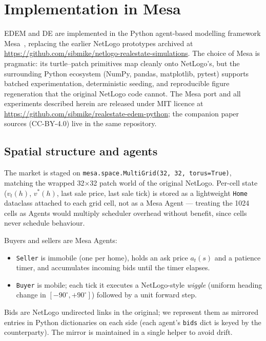\section{Implementation in Mesa}
\label{sec:implementation}

EDEM and DE are implemented in the Python agent-based modelling
framework Mesa~\citep{masad2015mesa}, replacing the earlier NetLogo
prototypes archived at
\url{https://github.com/sibmike/netlogo-realestate-simulations}. The
choice of Mesa is pragmatic: its turtle--patch primitives map cleanly
onto NetLogo's, but the surrounding Python ecosystem (NumPy, pandas,
matplotlib, pytest) supports batched experimentation, deterministic
seeding, and reproducible figure regeneration that the original
NetLogo code cannot. The Mesa port and all experiments described
herein are released under MIT licence at
\url{https://github.com/sibmike/realestate-edem-python}; the
companion paper sources (CC-BY-4.0) live in the same repository.

\subsection{Spatial structure and agents}
\label{sec:implementation-space}

The market is staged on \texttt{mesa.space.MultiGrid(32, 32, torus=True)},
matching the wrapped 32$\times$32 patch world of the original
NetLogo. Per-cell state ($v_{t}(h)$, $v^{*}(h)$, last sale price,
last sale tick) is stored as a lightweight \texttt{Home} dataclass
attached to each grid cell, not as a Mesa Agent --- treating the 1024
cells as Agents would multiply scheduler overhead without benefit,
since cells never schedule behaviour.

Buyers and sellers are Mesa Agents:
\begin{itemize}[leftmargin=*,nosep]
\item \texttt{Seller} is immobile (one per home), holds an ask price
      $a_{t}(s)$ and a patience timer, and accumulates incoming bids
      until the timer elapses.
\item \texttt{Buyer} is mobile; each tick it executes a NetLogo-style
      \emph{wiggle} (uniform heading change in $[-90^{\circ}, +90^{\circ}]$)
      followed by a unit forward step.
\end{itemize}
Bids are NetLogo undirected links in the original; we represent them
as mirrored entries in Python dictionaries on each side (each agent's
\texttt{bids} dict is keyed by the counterparty). The mirror is
maintained in a single helper to avoid drift.

